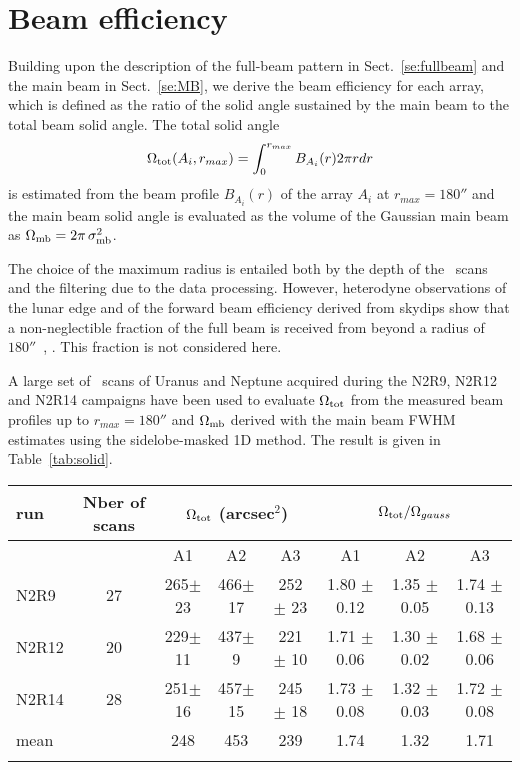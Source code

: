
\section{Beam efficiency}%
\label{se:beam_efficiency}

Building upon the description of the full-beam pattern in
Sect.~\ref{se:fullbeam} and the main beam in Sect.~\ref{se:MB},
we derive the beam efficiency for each array, which is defined as the
ratio of the solid angle sustained by the main beam to the total beam
solid angle.
The total solid angle
\begin{equation}
  \Omega_{\rm{tot}} (A_i, r_{max}) = \int_0^{r_{max}} B_{A_i}(r) 2 \pi r dr
\end{equation}
is estimated from the beam profile $B_{A_i}(r)$ of the array
$A_i$  at $r_{max} = 180''$ and the main beam solid angle is
evaluated as the volume of the Gaussian main beam as
$\Omega_{\rm{mb}} = 2 \pi\,  \sigma_{\rm{mb}}^2$.

The choice of the maximum radius is entailed both by the depth of
the \bm\ scans and the filtering due to the data processing.   
However, heterodyne observations of the lunar edge and of the forward
beam efficiency derived from skydips show that a non-neglectible
fraction of the full beam is received from beyond a radius of
$180''$~\cite{Greve2010}, \cite{Kramer2013}. This fraction is not considered here.

A large set of \bm\ scans of Uranus and Neptune acquired during the
N2R9, N2R12 and N2R14 campaigns have been used to evaluate
$\Omega_{\rm{tot}}$ from the measured beam profiles up to
$r_{max} =180''$ and $\Omega_{\rm{mb}}$  derived with the main beam FWHM
estimates using the sidelobe-masked 1D method. The result is given in
Table~\ref{tab:solid}.

\begin{table*}[!h]
\caption{Solid angle of true beam based on Uranus and Neptune observations}
\label{tab:solid}
\centering
\begin{tabular}{l| c | c c c | c c c}
\hline\hline
\noalign{\smallskip}
run  & Nber of scans & \multicolumn{3}{c}{$\Omega_{\rm{tot}}$ (arcsec$^{2}$)} & \multicolumn{3}{c}{$\Omega_{\rm{tot}}/\Omega_{gauss}$} \\
\hline
     &               &  A1    &    A2   &  A3  & A1  &  A2  & A3   \\
            \hline
N2R9    & 27  &  265$\pm$ 23    &  466$\pm$ 17 & 252 $\pm$ 23 &  1.80 $\pm$ 0.12    &  1.35 $\pm$ 0.05   &   1.74 $\pm$ 0.13   \\
N2R12   & 20  &  229$\pm$ 11    &  437$\pm$  9 & 221 $\pm$ 10 &  1.71 $\pm$ 0.06   &  1.30 $\pm$ 0.02   &   1.68 $\pm$ 0.06   \\
N2R14   & 28  &  251$\pm$ 16    &  457$\pm$ 15 & 245 $\pm$ 18 &  1.73 $\pm$ 0.08   &  1.32 $\pm$ 0.03   &   1.72 $\pm$ 0.08   \\
mean    &     &  248            &  453         &  239         &  1.74              &   1.32             &   1.71              \\
\noalign{\smallskip}
\hline
\end{tabular}
\end{table*}




